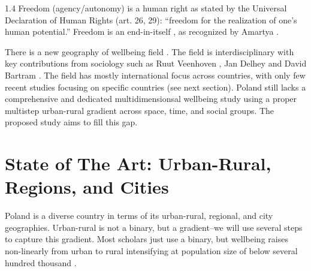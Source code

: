 \documentclass[10pt, letterpaper]{article}
\begin{document}
\begin{spacing}{1.4}
Freedom (agency/autonomy) is a human right as stated by the  Universal
Declaration of Human Rights (art. 26, 29): ``freedom for the realization of one's human potential.'' 
Freedom  is an end-in-itself%
, as recognized by 
 Amartya   \citet{sen00}.

There is a new geography of wellbeing field \citep[e.g.,][]{ballas2013geography}. 
 The field is interdisciplinary with key contributions from sociology such as
 Ruut Veenhoven
 \citep{brule2015geography,veenhoven1994satisfying,veenhoven2000freedom},
 Jan Delhey
 \citep{delhey2005predicting,delhey2003trusts,delhey2016happier,delhey2002quality,alber2005quality}
 and David Bartram
 \citep{bartram2013happiness,bartram2011economic,hendriks2019bringing,international2013world}.
 The field has mostly international focus across
countries, with only few recent studies focusing on specific
countries (see next section).
 Poland still lacks a comprehensive and dedicated multidimensionsal wellbeing study using a proper
 multistep urban-rural gradient across space, time, and social groups. The
 proposed study aims to fill this gap.

\section{State of The Art: Urban-Rural, Regions, and Cities}




Poland is a diverse country in terms of its urban-rural, regional, and city geographies. 
Urban-rural is not a binary, but a gradient--we will use several steps to
capture this gradient. Most scholars just use a binary, but wellbeing
raises non-linearly from urban to rural intensifying at population size of below several
hundred thousand \citep{aok-ls_fisher16}. 


\end{spacing}
\end{document}
